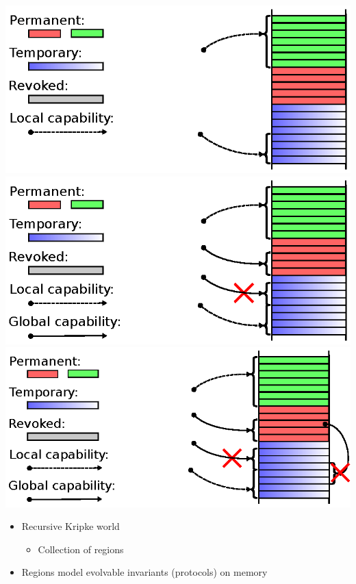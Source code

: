 \documentclass{beamer}
\begin{document}
\begin{frame}
\begin{overprint}
    \includegraphics{Worlds/w8.eps}
    \includegraphics{Worlds/w9.eps}
    \includegraphics{Worlds/w10.eps}
  \end{overprint}
  \begin{overprint}
    \begin{itemize}
    \item Recursive Kripke world
      \begin{itemize}
      \item Collection of regions
      \end{itemize}
    \item Regions model evolvable invariants (protocols) on memory

\end{itemize}
\end{overprint}
\end{frame}
\end{document}
